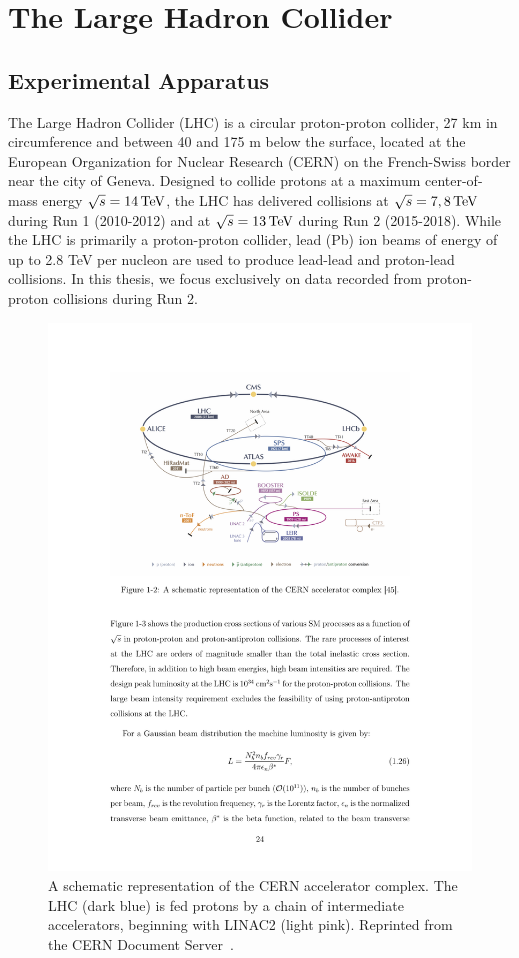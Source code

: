 \chapter{The Large Hadron Collider}

\section{Experimental Apparatus}

The Large Hadron Collider (LHC) is a circular proton-proton collider, 27 km in circumference and between 40 and 175 m below the surface, located at the European Organization for Nuclear Research (CERN) on the French-Swiss border near the city of Geneva.
Designed to collide protons at a maximum center-of-mass energy $\sqrt{s} = 14\,\text{Te\hspace{-.08em}V}$, the LHC has delivered collisions at $\sqrt{s} = 7, 8 \,\text{Te\hspace{-.08em}V}$ during Run 1 (2010-2012) and at $\sqrt{s} = 13\,\text{Te\hspace{-.08em}V}$ during Run 2 (2015-2018).
While the LHC is primarily a proton-proton collider, lead (Pb) ion beams of energy of up to 2.8 TeV per nucleon are used to produce lead-lead and proton-lead collisions.
In this thesis, we focus exclusively on data recorded from proton-proton collisions during Run 2.

\begin{figure}[htbp]
  \centering
  \includegraphics[width=.775\textwidth]{Collider/Figures/LHC_diagram.pdf}
  \caption{
    A schematic representation of the CERN accelerator complex. 
    The LHC (dark blue) is fed protons by a chain of intermediate accelerators, beginning with LINAC2 (light pink).
    Reprinted from the CERN Document Server~\cite{}. %
  }
  \label{fig:lhc}
\end{figure}

